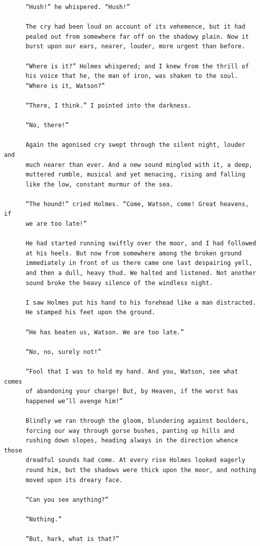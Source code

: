 \documentclass{article}
\begin{document}
\begin{verbatim}
      “Hush!” he whispered. “Hush!”

      The cry had been loud on account of its vehemence, but it had
      pealed out from somewhere far off on the shadowy plain. Now it
      burst upon our ears, nearer, louder, more urgent than before.

      “Where is it?” Holmes whispered; and I knew from the thrill of
      his voice that he, the man of iron, was shaken to the soul.
      “Where is it, Watson?”

      “There, I think.” I pointed into the darkness.

      “No, there!”

      Again the agonised cry swept through the silent night, louder and
      much nearer than ever. And a new sound mingled with it, a deep,
      muttered rumble, musical and yet menacing, rising and falling
      like the low, constant murmur of the sea.

      “The hound!” cried Holmes. “Come, Watson, come! Great heavens, if
      we are too late!”

      He had started running swiftly over the moor, and I had followed
      at his heels. But now from somewhere among the broken ground
      immediately in front of us there came one last despairing yell,
      and then a dull, heavy thud. We halted and listened. Not another
      sound broke the heavy silence of the windless night.

      I saw Holmes put his hand to his forehead like a man distracted.
      He stamped his feet upon the ground.

      “He has beaten us, Watson. We are too late.”

      “No, no, surely not!”

      “Fool that I was to hold my hand. And you, Watson, see what comes
      of abandoning your charge! But, by Heaven, if the worst has
      happened we’ll avenge him!”

      Blindly we ran through the gloom, blundering against boulders,
      forcing our way through gorse bushes, panting up hills and
      rushing down slopes, heading always in the direction whence those
      dreadful sounds had come. At every rise Holmes looked eagerly
      round him, but the shadows were thick upon the moor, and nothing
      moved upon its dreary face.

      “Can you see anything?”

      “Nothing.”

      “But, hark, what is that?”


\end{verbatim}
\end{document}
